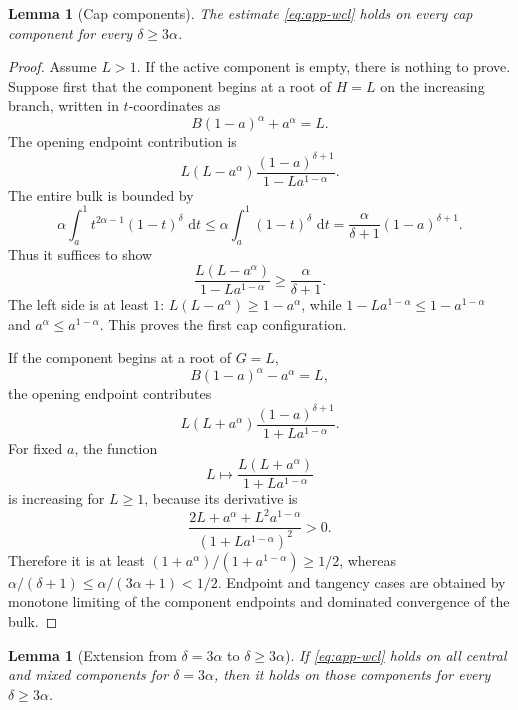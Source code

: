 \documentclass[pdflatex,sn-mathphys-num]{sn-jnl}
\numberwithin{equation}{section}
\theoremstyle{thmstyleone}
\newtheorem{lemma}[theorem]{Lemma}
\theoremstyle{thmstylethree}
\newcommand{\1}{\mathbf{1}}
\newcommand{\dd}{\,\mathrm{d}}
\begin{document}
\begin{lemma}[Cap components]\label{lem:app-cap-component}
The estimate \eqref{eq:app-wcl} holds on every cap component for every $\delta\ge3\alpha$.
\end{lemma}

\begin{proof}
Assume $L>1$. If the active component is empty, there is nothing to prove. Suppose first that the component begins at a root of $H=L$ on the increasing branch, written in $t$-coordinates as
\[
 B(1-a)^\alpha+a^\alpha=L.
\]
The opening endpoint contribution is
\[
 L(L-a^\alpha)\frac{(1-a)^{\delta+1}}{1-La^{1-\alpha}}.
\]
The entire bulk is bounded by
\[
 \alpha\int_a^1 t^{2\alpha-1}(1-t)^\delta\,\dd t
 \le \alpha\int_a^1(1-t)^\delta\,\dd t
 =\frac{\alpha}{\delta+1}(1-a)^{\delta+1}.
\]
Thus it suffices to show
\[
 \frac{L(L-a^\alpha)}{1-La^{1-\alpha}}\ge\frac{\alpha}{\delta+1}.
\]
The left side is at least $1$: $L(L-a^\alpha)\ge1-a^\alpha$, while $1-La^{1-\alpha}\le1-a^{1-\alpha}$ and $a^\alpha\le a^{1-\alpha}$. This proves the first cap configuration.

If the component begins at a root of $G=L$,
\[
 B(1-a)^\alpha-a^\alpha=L,
\]
the opening endpoint contributes
\[
 L(L+a^\alpha)\frac{(1-a)^{\delta+1}}{1+La^{1-\alpha}}.
\]
For fixed $a$, the function
\[
 L\mapsto \frac{L(L+a^\alpha)}{1+La^{1-\alpha}}
\]
is increasing for $L\ge1$, because its derivative is
\[
 \frac{2L+a^\alpha+L^2a^{1-\alpha}}{(1+La^{1-\alpha})^2}>0.
\]
Therefore it is at least $(1+a^\alpha)/(1+a^{1-\alpha})\ge1/2$, whereas $\alpha/(\delta+1)\le\alpha/(3\alpha+1)<1/2$. Endpoint and tangency cases are obtained by monotone limiting of the component endpoints and dominated convergence of the bulk.
\end{proof}

\begin{lemma}[Extension from $\delta=3\alpha$ to $\delta\ge3\alpha$]\label{lem:app-delta-extension}
If \eqref{eq:app-wcl} holds on all central and mixed components for $\delta=3\alpha$, then it holds on those components for every $\delta\ge3\alpha$.
\end{lemma}
\end{document}
